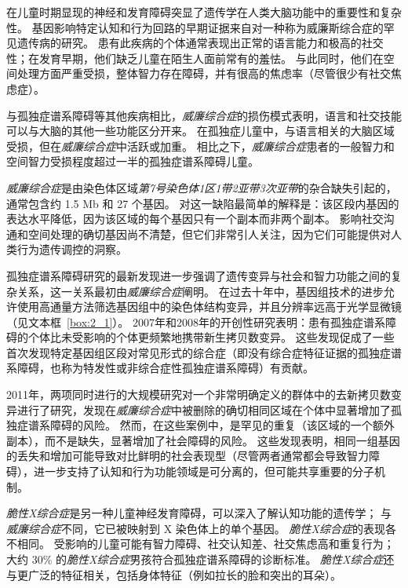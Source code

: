 在儿童时期显现的神经和发育障碍突显了遗传学在人类大脑功能中的重要性和复杂性。
基因影响特定认知和行为回路的早期证据来自对一种称为威廉斯综合症的罕见遗传病的研究。
患有此疾病的个体通常表现出正常的语言能力和极高的社交性；在发育早期，他们缺乏儿童在陌生人面前常有的羞怯。
与此同时，他们在空间处理方面严重受损，整体智力存在障碍，并有很高的焦虑率（尽管很少有社交焦虑症）。


与孤独症谱系障碍等其他疾病相比，\textit{威廉综合症}的损伤模式表明，语言和社交技能可以与大脑的其他一些功能区分开来。
在孤独症儿童中，与语言相关的大脑区域受损，但在\textit{威廉综合症}中活跃或加重。
相比之下，\textit{威廉综合症}患者的一般智力和空间智力受损程度超过一半的孤独症谱系障碍儿童。


\textit{威廉综合症}是由染色体区域\textit{第7号染色体1区1带2亚带3次亚带}的杂合缺失引起的，通常包含约 1.5 Mb 和 27 个基因。
对这一缺陷最简单的解释是：该区段内基因的表达水平降低，因为该区域的每个基因只有一个副本而非两个副本。
影响社交沟通和空间处理的确切基因尚不清楚，但它们非常引人关注，因为它们可能提供对人类行为遗传调控的洞察。



孤独症谱系障碍研究的最新发现进一步强调了遗传变异与社会和智力功能之间的复杂关系，这一关系最初由\textit{威廉综合症}阐明。
在过去十年中，基因组技术的进步允许使用高通量方法筛选基因组中的染色体结构变异，并且分辨率远高于光学显微镜（见文本框~\ref{box:2_1}）。
2007年和2008年的开创性研究表明：患有孤独症谱系障碍的个体比未受影响的个体更频繁地携带新生拷贝数变异。
这些发现促成了一些首次发现特定基因组区段对常见形式的综合症（即没有综合症特征证据的孤独症谱系障碍，也称为特发性或非综合症性孤独症谱系障碍）有贡献。


2011年，两项同时进行的大规模研究对一个非常明确定义的群体中的去新拷贝数变异进行了研究，发现在\textit{威廉综合症}中被删除的确切相同区域在个体中显著增加了孤独症谱系障碍的风险。
然而，在这些案例中，是罕见的重复（该区域的一个额外副本），而不是缺失，显著增加了社会障碍的风险。
这些发现表明，相同一组基因的丢失和增加可能导致对比鲜明的社会表现型（尽管两者通常都会导致智力障碍），进一步支持了认知和行为功能领域是可分离的，但可能共享重要的分子机制。



\textit{脆性X综合症}是另一种儿童神经发育障碍，可以深入了解认知功能的遗传学；
与\textit{威廉综合症}不同，它已被映射到 X 染色体上的单个基因。
\textit{脆性X综合症}的表现各不相同。
受影响的儿童可能有智力障碍、社交认知差、社交焦虑高和重复行为；
大约 30\% 的\textit{脆性X综合症}男孩符合孤独症谱系障碍的诊断标准。
\textit{脆性X综合症}还与更广泛的特征相关，包括身体特征（例如拉长的脸和突出的耳朵）。



